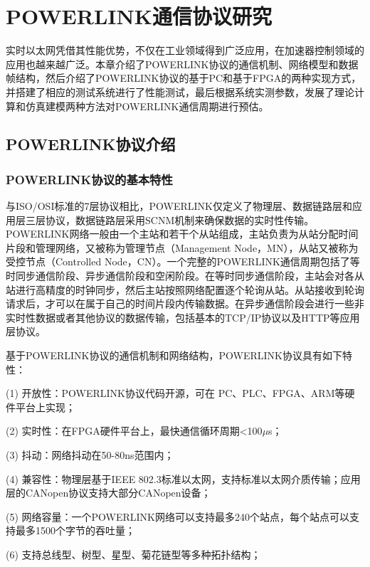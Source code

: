 
\chapter{POWERLINK通信协议研究}

实时以太网凭借其性能优势，不仅在工业领域得到广泛应用，在加速器控制领域的应用也越来越广泛。本章介绍了POWERLINK协议的通信机制、网络模型和数据帧结构，然后介绍了POWERLINK协议的基于PC和基于FPGA的两种实现方式，并搭建了相应的测试系统进行了性能测试，最后根据系统实测参数，发展了理论计算和仿真建模两种方法对POWERLINK通信周期进行预估。

\section{POWERLINK协议介绍}

\subsection{POWERLINK协议的基本特性}

与ISO/OSI标准的7层协议相比，POWERLINK仅定义了物理层、数据链路层和应用层三层协议，数据链路层采用SCNM机制来确保数据的实时性传输\cite{powerlink}。POWERLINK网络一般由一个主站和若干个从站组成，主站负责为从站分配时间片段和管理网络，又被称为管理节点（Management Node，MN），从站又被称为受控节点（Controlled Node，CN）。一个完整的POWERLINK通信周期包括了等时同步通信阶段、异步通信阶段和空闲阶段。在等时同步通信阶段，主站会对各从站进行高精度的时钟同步，然后主站按照网络配置逐个轮询从站。从站接收到轮询请求后，才可以在属于自己的时间片段内传输数据。在异步通信阶段会进行一些非实时性数据或者其他协议的数据传输，包括基本的TCP/IP协议以及HTTP等应用层协议\cite{powerlink}。

基于POWERLINK协议的通信机制和网络结构，POWERLINK协议具有如下特性\cite{ESPG}：

(1) 开放性：POWERLINK协议代码开源，可在 PC、PLC、FPGA、ARM等硬件平台上实现；

(2) 实时性：在FPGA硬件平台上，最快通信循环周期<100$\mu$s；

(3) 抖动：网络抖动在50-80ns范围内；

(4) 兼容性：物理层基于IEEE 802.3标准以太网，支持标准以太网介质传输；应用层的CANopen协议支持大部分CANopen设备；

(5) 网络容量：一个POWERLINK网络可以支持最多240个站点，每个站点可以支持最多1500个字节的吞吐量；

(6) 支持总线型、树型、星型、菊花链型等多种拓扑结构；

